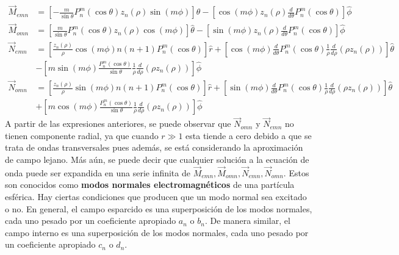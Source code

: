 \begin{align*}
    \Vec{M}_{emn}   &=\left[-\frac{m}{\sin\theta}P_n^m(\cos\theta)z_n(\rho)\sin (m\phi)\right]\hat{\theta}-\left[\cos(m\phi)z_n(\rho)\frac{d}{d\theta}P_n^m(\cos\theta)\right]\hat{\phi}\\
    \Vec{M}_{omn}  &=\left[\frac{m}{\sin\theta}P_n^m(\cos\theta)z_n(\rho)\cos (m\phi)\right]\hat{\theta}-\left[\sin(m\phi)z_n(\rho)\frac{d}{d\theta}P_n^m(\cos\theta)\right]\hat{\phi}\\
    \Vec{N}_{emn}&=\left[\frac{z_n(\rho)}{\rho}\cos(m\phi)n(n+1)P_n^m(\cos\theta)\right]\hat{r} +\left[\cos(m\phi)\frac{d}{d\theta}P_n^m(\cos\theta)\frac{1}{\rho}\frac{d}{d\rho}(\rho z_n(\rho))\right]\hat{\theta}\\&-\left[m\sin(m\phi)\frac{P_n^m(\cos\theta)}{\sin\theta}\frac{1}{\rho}\frac{d}{d\rho}(\rho z_n(\rho))\right]\hat{\phi}\\
    \Vec{N}_{omn}&=\left[\frac{z_n(\rho)}{\rho}\sin(m\phi)n(n+1)P_n^m(\cos\theta)\right]\hat{r}+\left[\sin(m\phi)\frac{d}{d\theta}P_n^m(\cos\theta)\frac{1}{\rho}\frac{d}{d\rho}(\rho z_n(\rho))\right]\hat{\theta}\\&+\left[m\cos(m\phi)\frac{P_n^m(\cos\theta)}{\sin\theta}\frac{1}{\rho}\frac{d}{d\rho}(\rho z_n(\rho))\right]\hat{\phi}
\end{align*}
A partir de las expresiones anteriores, se puede observar que $\Vec{N}_{omn}$ y $\Vec{N}_{emn}$ no tienen componente radial, ya que cuando $r\gg 1$ esta tiende a cero debido a que se trata de ondas transversales pues además, se está considerando la aproximación de campo lejano. Más aún, se puede decir que cualquier solución a la ecuación de onda puede ser expandida en una serie infinita de $\Vec{M}_{emn},\Vec{M}_{omn},\Vec{N}_{emn},\Vec{N}_{omn}$. Estos son conocidos como \textbf{modos normales electromagnéticos} de una partícula esférica. Hay ciertas condiciones que producen que un modo normal sea excitado o no. En general, el campo esparcido es una superposición de los modos normales, cada uno pesado por un coeficiente apropiado $a_n$ o $b_n$. De manera similar, el campo interno es una superposición de los modos normales, cada uno pesado por un coeficiente apropiado $c_n$ o $d_n$.\cite{Bohren}\\

